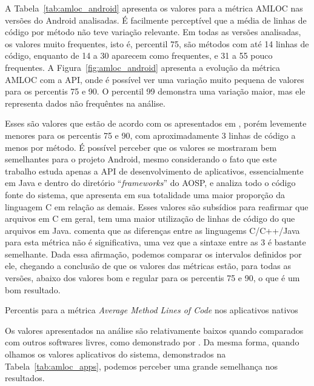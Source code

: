 A Tabela~\ref{tab:amloc_android} apresenta os valores para a métrica AMLOC nas versões do Android analisadas. É facilmente perceptível que a média de linhas de código por método não teve variação relevante. Em todas as versões analisadas, os valores muito frequentes, isto é, percentil 75, são métodos com até 14 linhas de código, enquanto de 14 a 30 aparecem como frequentes, e 31 a 55 pouco frequentes. A Figura~\ref{fig:amloc_android} apresenta a evolução da métrica AMLOC com a API, onde é possível ver uma variação muito pequena de valores para os percentis 75 e 90. O percentil 99 demonstra uma variação maior, mas ele representa dados não frequêntes na análise.

Esses são valores que estão de acordo com os apresentados em , porém levemente menores para os percentis 75 e 90, com aproximadamente 3 linhas de código a menos por método. É possível perceber que os valores se mostraram bem semelhantes para o projeto Android, mesmo considerando o fato que este trabalho estuda apenas a API de desenvolvimento de aplicativos, essencialmente em Java e dentro do diretório ``\textit{frameworks}'' do AOSP, e  analiza todo o código fonte do sistema, que apresenta em sua totalidade uma maior proporção da linguagem C em relação as demais. Esses valores são subsídios para reafirmar que arquivos em C em geral, tem uma maior utilização de linhas de código do que arquivos em Java.  comenta que as diferenças entre as linguagems C/C++/Java para esta métrica não é significativa, uma vez que a sintaxe entre as 3 é bastante semelhante. Dada essa afirmação, podemos comparar os intervalos definidos por ele, chegando a conclusão de que os valores das métricas estão, para todas as versões, abaixo dos valores bom e regular para os percentis 75 e 90, o que é um bom resultado.

\begin{table}[!htb]
\centering
{}

\caption{Percentis para a métrica \textit{Average Method Lines of Code} nos aplicativos nativos}
\label{tab:amloc_apps}
\end{table}

Os valores apresentados na análise são relativamente baixos quando comparados com outros softwares livres, como demonstrado por . Da mesma forma, quando olhamos os valores aplicativos do sistema, demonstrados na Tabela~\ref{tab:amloc_apps}, podemos perceber uma grande semelhança nos resultados. 

